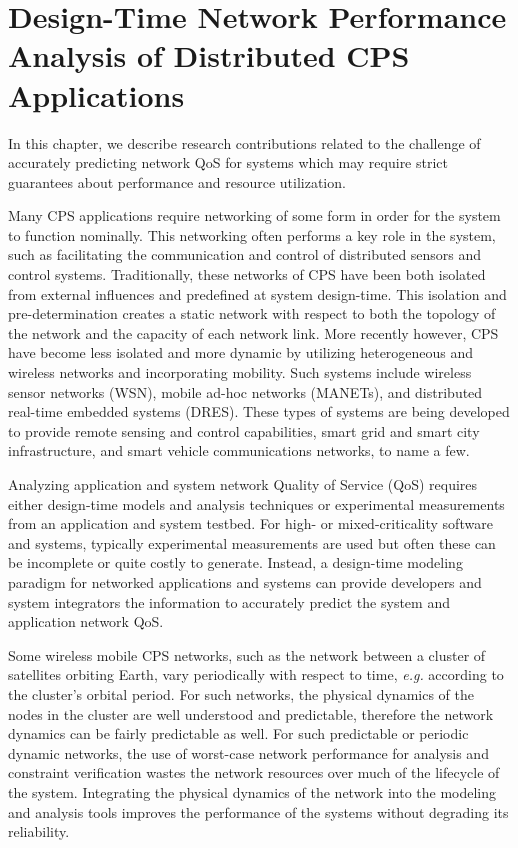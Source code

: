 \chapter{Design-Time Network Performance Analysis of Distributed CPS Applications}
\label{ch:designTime}

In this chapter, we describe research contributions related to the
challenge of accurately predicting network QoS for systems which may
require strict guarantees about performance and resource utilization.

Many CPS applications require networking of some form in order for the
system to function nominally.  This networking often performs a key
role in the system, such as facilitating the communication and control
of distributed sensors and control systems.  Traditionally, these
networks of CPS have been both isolated from external influences and
predefined at system design-time.  This isolation and
pre-determination creates a static network with respect to both the
topology of the network and the capacity of each network link.  More
recently however, CPS have become less isolated and more dynamic by
utilizing heterogeneous and wireless networks and incorporating
mobility.  Such systems include wireless sensor networks (WSN), mobile
ad-hoc networks (MANETs), and distributed real-time embedded systems
(DRES).  These types of systems are being developed to provide remote
sensing and control capabilities, smart grid and smart city
infrastructure, and smart vehicle communications networks, to name a
few.

Analyzing application and system network Quality of Service (QoS)
requires either design-time models and analysis techniques or
experimental measurements from an application and system testbed.  For
high- or mixed-criticality software and systems, typically
experimental measurements are used but often these can be incomplete
or quite costly to generate.  Instead, a design-time modeling paradigm
for networked applications and systems can provide developers and
system integrators the information to accurately predict the system
and application network QoS.

Some wireless mobile CPS networks, such as the network between a
cluster of satellites orbiting Earth, vary periodically with respect
to time, \emph{e.g.} according to the cluster's orbital period.  For
such networks, the physical dynamics of the nodes in the cluster are
well understood and predictable, therefore the network dynamics can be
fairly predictable as well.  For such predictable or periodic dynamic
networks, the use of worst-case network performance for analysis and
constraint verification wastes the network resources over much of the
lifecycle of the system. Integrating the physical dynamics of the
network into the modeling and analysis tools improves the performance
of the systems without degrading its reliability. 


